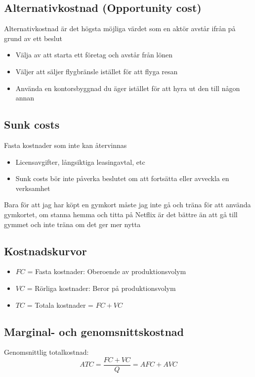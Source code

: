 \documentclass[12pt,a4paper]{article}
\begin{document}
{\subsection*{Alternativkostnad (Opportunity cost)}
Alternativkostnad är det högsta möjliga värdet som en aktör avstår ifrån på grund av ett beslut

\begin{itemize}
    \item Välja av att starta ett företag och avstår från lönen
    \item Väljer att säljer flygbränsle istället för att flyga resan
    \item Använda en kontorsbyggnad du äger istället för att hyra ut den till någon annan 
\end{itemize}

\subsection*{Sunk costs}
Fasta kostnader som inte kan återvinnas
\begin{itemize}
    \item Licensavgifter, långsiktiga leasingavtal, etc
    \item Sunk costs bör inte påverka beslutet om att fortsätta eller avveckla en verksamhet
\end{itemize}

\noindent Bara för att jag har köpt en gymkort måste jag inte gå och träna för att använda gymkortet, om stanna hemma och titta på Netflix är det bättre än att gå till gymmet och inte träna om det ger mer nytta

\subsection*{Kostnadskurvor}

\begin{itemize}
    \item $FC$ = Fasta kostnader: Oberoende av produktionsvolym
    \item $VC$ = Rörliga kostnader: Beror på produktionsvolym
    \item $TC$ = Totala kostnader = $FC + VC$
\end{itemize}

\subsection*{Marginal- och genomsnittskostnad}
Genomsnittlig totalkostnad:
$$ATC = \frac{FC+VC}{Q} = AFC + AVC$$

}
\end{document}
